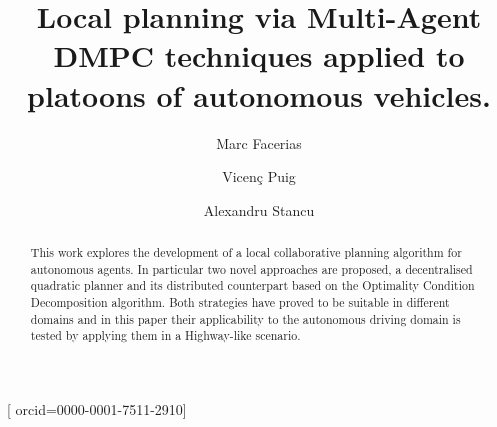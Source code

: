 \documentclass[a4paper,fleqn]{cas-sc}
\begin{document}
\let\WriteBookmarks\relax
\def\floatpagepagefraction{1}
\def\textpagefraction{.001}

\title [mode = title]{Local planning via Multi-Agent DMPC techniques applied to platoons of autonomous vehicles.}                    

%
\author[1,2]{Marc Facerias}[                   orcid=0000-0001-7511-2910]


    
\author[2]{Vicenç Puig}


\author[1]{Alexandru Stancu}
\begin{abstract}
This work explores the development of a local collaborative planning algorithm for autonomous agents. In particular two novel approaches are proposed, a decentralised quadratic planner and its distributed counterpart based on the Optimality Condition Decomposition algorithm. Both strategies have proved to be suitable in different domains and in this paper their applicability to the autonomous driving domain is tested by applying them in a Highway-like scenario.  
\end{abstract}


\end{document}

